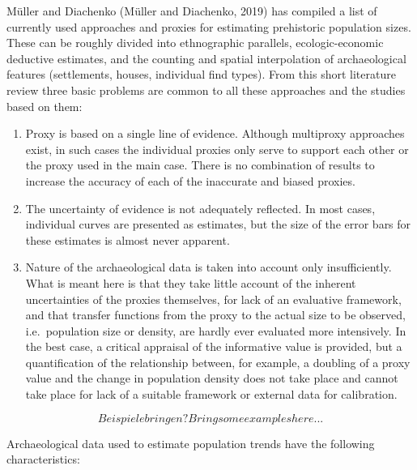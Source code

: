 \documentclass[
]{article}
\providecommand{\tightlist}{%
  \setlength{\itemsep}{0pt}\setlength{\parskip}{0pt}}
\begin{document}
Müller and Diachenko (Müller and Diachenko, 2019) has compiled a list of currently used approaches and proxies for estimating prehistoric population sizes. These can be roughly divided into ethnographic parallels, ecologic-economic deductive estimates, and the counting and spatial interpolation of archaeological features (settlements, houses, individual find types). From this short literature review three basic problems are common to all these approaches and the studies based on them:

\begin{enumerate}
\def\labelenumi{\arabic{enumi}.}
\tightlist
\item
  Proxy is based on a single line of evidence. Although multiproxy approaches exist, in such cases the individual proxies only serve to support each other or the proxy used in the main case. There is no combination of results to increase the accuracy of each of the inaccurate and biased proxies.
\item
  The uncertainty of evidence is not adequately reflected. In most cases, individual curves are presented as estimates, but the size of the error bars for these estimates is almost never apparent.
\item
  Nature of the archaeological data is taken into account only insufficiently. What is meant here is that they take little account of the inherent uncertainties of the proxies themselves, for lack of an evaluative framework, and that transfer functions from the proxy to the actual size to be observed, i.e.~population size or density, are hardly ever evaluated more intensively. In the best case, a critical appraisal of the informative value is provided, but a quantification of the relationship between, for example, a doubling of a proxy value and the change in population density does not take place and cannot take place for lack of a suitable framework or external data for calibration.
\end{enumerate}

\[Beispiele bringen? Bring some examples here...\]

Archaeological data used to estimate population trends have the following characteristics:
\end{document}
